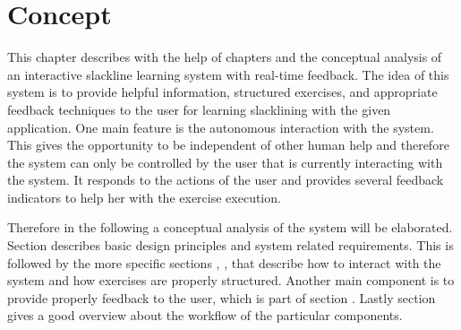 \chapter{Concept}\label{4_concept}
This chapter describes with the help of chapters \textit{} and \textit{} the conceptual analysis of an interactive slackline learning system with real-time feedback. The idea of this system is to provide helpful information, structured exercises, and appropriate feedback techniques to the user for learning slacklining with the given application. One main feature is the autonomous interaction with the system. This gives the opportunity to be independent of other human help and therefore the system can only be controlled by the user that is currently interacting with the system. It responds to the actions of the user and provides several feedback indicators to help her with the exercise execution. 

Therefore in the following a conceptual analysis of the system will be elaborated. Section \textit{} describes basic design principles and system related requirements. This is followed by the more specific sections \textit{}, \textit{}, \textit{} that describe how to interact with the system and how exercises are properly structured. Another main component is to provide properly feedback to the user, which is part of section \textit{}. Lastly section \textit{} gives a good overview about the workflow of the particular components.






